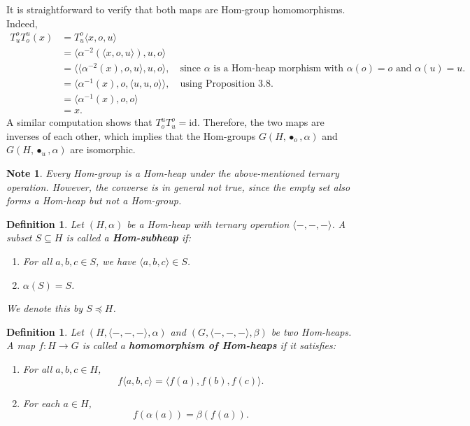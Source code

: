 \documentclass[14pt]{article}
\newtheorem{Note}[thm]{Note}
\theoremstyle{Definition}
\newtheorem{Def}[thm]{Definition}
\theoremstyle{remark}
\begin{document}
It is straightforward to verify that both maps are Hom-group homomorphisms. Indeed,
\begin{align*}
T_u^o T_o^u (x) &= T_u^o \langle x, o, u \rangle\\
&=\langle \alpha^{-2} (\langle x, o, u \rangle), u, o \rangle \\
&= \langle \langle \alpha^{-2}(x), o, u \rangle, u, o \rangle, \quad \text{since $\alpha$ is a Hom-heap morphism with $\alpha(o) = o$ and $\alpha(u) = u$.} \\
&= \langle \alpha^{-1}(x), o, \langle u, u, o \rangle \rangle, \quad \text{using Proposition 3.8.} \\
&= \langle \alpha^{-1}(x), o, o \rangle \\
&= x.
\end{align*}
A similar computation shows that $T_o^u T_u^o = \mathrm{id}$. Therefore, the two maps are inverses of each other, which implies that the Hom-groups $G(H, \bullet_o, \alpha)$ and $G(H, \bullet_u, \alpha)$ are isomorphic.

\begin{Note}
Every Hom-group is a Hom-heap under the above-mentioned ternary operation.  
However, the converse is in general not true, since the empty set also forms a Hom-heap but not a Hom-group.
\end{Note}
\begin{Def}
Let $(H, \alpha)$ be a Hom-heap with ternary operation $\langle -,-,- \rangle$.  
A subset $S \subseteq H$ is called a \textbf{Hom-subheap} if:
\begin{enumerate}
    \item For all $a,b,c \in S$, we have $\langle a,b,c \rangle \in S$.
    \item  $\alpha(S)= S$.
\end{enumerate}
We denote this by $S \preceq H$.
\end{Def}

\begin{Def}
Let $(H, \langle -,-,- \rangle, \alpha)$ and $(G, \langle -,-,- \rangle, \beta)$ be two Hom-heaps.  
A map $f: H \to G$ is called a \textbf{homomorphism of Hom-heaps} if it satisfies:
\begin{enumerate}
    \item For all $a,b,c \in H$,  
    \[
    f\langle a, b, c \rangle = \langle f(a), f(b), f(c) \rangle.
    \]
    \item For each $a \in H$,  
    \[
    f(\alpha(a)) = \beta(f(a)).
    \]
\end{enumerate}
\end{Def}
\end{document}
